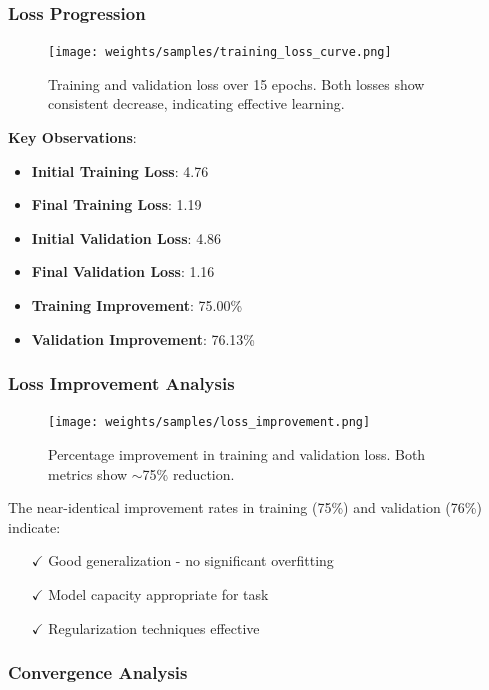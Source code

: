 \documentclass[12pt,a4paper]{article}
\begin{document}
\subsubsection{Loss Progression}

\begin{figure}[H]
\centering
\texttt{[image: weights/samples/training\_loss\_curve.png]}
\caption{Training and validation loss over 15 epochs. Both losses show consistent decrease, indicating effective learning.}
\label{fig:training_loss}
\end{figure}

\textbf{Key Observations}:
\begin{itemize}
    \item \textbf{Initial Training Loss}: 4.76
    \item \textbf{Final Training Loss}: 1.19
    \item \textbf{Initial Validation Loss}: 4.86
    \item \textbf{Final Validation Loss}: 1.16
    \item \textbf{Training Improvement}: 75.00\%
    \item \textbf{Validation Improvement}: 76.13\%
\end{itemize}

\subsubsection{Loss Improvement Analysis}

\begin{figure}[H]
\centering
\texttt{[image: weights/samples/loss\_improvement.png]}
\caption{Percentage improvement in training and validation loss. Both metrics show $\sim$75\% reduction.}
\label{fig:loss_improvement}
\end{figure}

The near-identical improvement rates in training (75\%) and validation (76\%) indicate:
\begin{itemize}
    \item[$\checkmark$] Good generalization - no significant overfitting
    \item[$\checkmark$] Model capacity appropriate for task
    \item[$\checkmark$] Regularization techniques effective
\end{itemize}

\subsubsection{Convergence Analysis}
\end{document}
